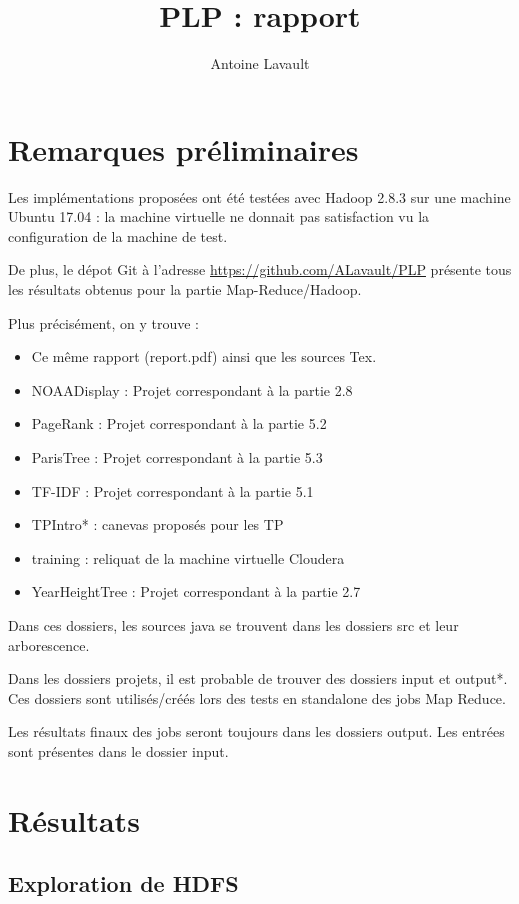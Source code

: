 \documentclass[french]{article}
\title{PLP : rapport}
\author{Antoine Lavault}
\begin{document}
\maketitle

\section*{Remarques préliminaires}

Les implémentations proposées ont été testées avec Hadoop 2.8.3 sur une machine Ubuntu 17.04 : la machine virtuelle ne donnait pas satisfaction vu la configuration de la machine de test.

De plus, le dépot Git à l'adresse \href{https://github.com/ALavault/PLP}{https://github.com/ALavault/PLP} présente tous les résultats obtenus pour la partie Map-Reduce/Hadoop.

Plus précisément, on y trouve :
\begin{itemize}
	\item Ce même rapport (report.pdf) ainsi que les sources Tex.
	\item NOAADisplay : Projet correspondant à la partie 2.8
	\item PageRank : Projet correspondant à la partie 5.2
	\item ParisTree : Projet correspondant à la partie 5.3
	\item TF-IDF : Projet correspondant à la partie 5.1
	\item TPIntro* : canevas proposés pour les TP
	\item training : reliquat de la machine virtuelle Cloudera
	\item YearHeightTree : Projet correspondant à la partie 2.7
\end{itemize}

Dans ces dossiers, les sources java se trouvent dans les dossiers src et leur arborescence.

Dans les dossiers projets, il est probable de trouver des dossiers input et output*. Ces dossiers sont utilisés/créés lors des tests en standalone des jobs Map Reduce. 

Les résultats finaux des jobs seront toujours dans les dossiers output. Les entrées sont présentes dans le dossier input.




\section{Résultats}
\subsection{Exploration de HDFS}
\end{document}
